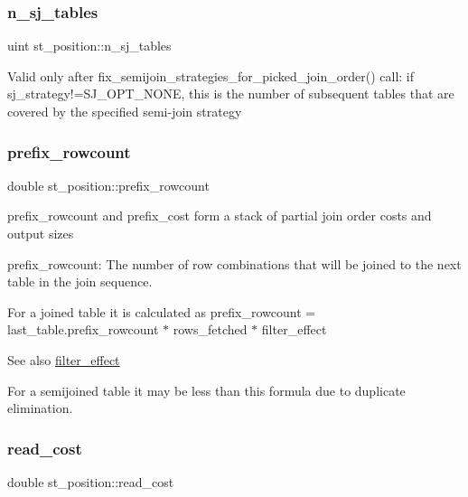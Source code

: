 \subsubsection{\texorpdfstring{n\+\_\+sj\+\_\+tables}{n\_sj\_tables}}
{\footnotesize\ttfamily uint st\+\_\+position\+::n\+\_\+sj\+\_\+tables}

Valid only after fix\+\_\+semijoin\+\_\+strategies\+\_\+for\+\_\+picked\+\_\+join\+\_\+order() call\+: if sj\+\_\+strategy!=S\+J\+\_\+\+O\+P\+T\+\_\+\+N\+O\+NE, this is the number of subsequent tables that are covered by the specified semi-\/join strategy \mbox{\label{structst__position_aa29ae7911f9cc07153c57c5bc9ff9617}} 
\subsubsection{\texorpdfstring{prefix\+\_\+rowcount}{prefix\_rowcount}}
{\footnotesize\ttfamily double st\+\_\+position\+::prefix\+\_\+rowcount}

prefix\+\_\+rowcount and prefix\+\_\+cost form a stack of partial join order costs and output sizes

prefix\+\_\+rowcount\+: The number of row combinations that will be joined to the next table in the join sequence.

For a joined table it is calculated as prefix\+\_\+rowcount = last\+\_\+table.\+prefix\+\_\+rowcount $\ast$ rows\+\_\+fetched $\ast$ filter\+\_\+effect

\begin{DoxySeeAlso}{See also}
\mbox{\hyperlink{structst__position_af2d5d5e5b65710d3a1a1ae38b14f44de}{filter\+\_\+effect}}
\end{DoxySeeAlso}
For a semijoined table it may be less than this formula due to duplicate elimination. \mbox{\label{structst__position_a455bdd05662b3e0e7670501bf0788cdd}} 
\subsubsection{\texorpdfstring{read\+\_\+cost}{read\_cost}}
{\footnotesize\ttfamily double st\+\_\+position\+::read\+\_\+cost}


